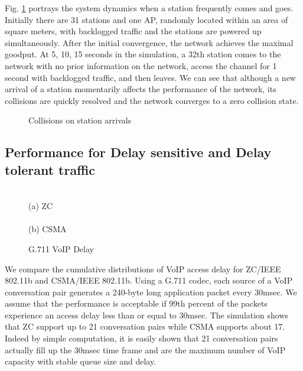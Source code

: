 \documentclass{acm_proc_article-sp}
\begin{document}
Fig. \ref{fig.delay} portrays the system dynamics when a station frequently comes and goes. Initially there are 31 stations and one AP, randomly located within an area of  square meters, with backlogged traffic and the stations are powered up simultaneously. After the initial convergence, the network achieves the maximal goodput. At 5, 10, 15 seconds in the simulation, a 32th station comes to the network with no prior information on the network, access the channel for 1 second with backlogged traffic, and then leaves. We can see that although a new arrival of a station momentarily affects the performance of the network, its collisions are quickly resolved and the network converges to a zero collision state.
\begin{figure}[ht]
    \begin{center}\small
{}\normalsize
    \caption{Collisions on station arrivals}\label{fig.delay}
    \end{center}
\vspace{-0.2in}
\end{figure}
\subsection{Performance for Delay sensitive and Delay tolerant traffic}
\label{s.voipdelaycapacity}
\begin{figure}[ht]
    \begin{center}\small
     \\ (a) ZC \\
    \\ (b) CSMA
    \normalsize
    \caption{G.711 VoIP Delay}\label{fig.voipdelay}
    \end{center}
\vspace{-0.2in}
\end{figure}
We compare the cumulative distributions of VoIP access delay for ZC/IEEE 802.11b and CSMA/IEEE 802.11b. Using a G.711 codec, each source of a VoIP conversation pair generates a 240-byte long application packet every 30msec. We assume that the performance is acceptable if 99th percent of the packets experience an access delay less than or equal to 30msec. The simulation shows that ZC support up to 21 conversation pairs while CSMA supports about 17.  Indeed by simple computation, it is easily shown that 21 conversation pairs actually fill up the 30msec time frame and are the maximum number of VoIP capacity with stable queue size and delay.
\end{document}
